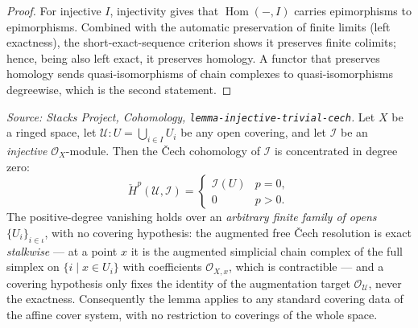 \begin{proof}
  For injective \(I\), injectivity gives that \(\operatorname{Hom}(-, I)\) carries
  epimorphisms to epimorphisms. Combined with the automatic preservation of finite limits
  (left exactness), the short-exact-sequence criterion shows it preserves finite colimits;
  hence, being also left exact, it preserves homology. A functor that preserves homology
  sends quasi-isomorphisms of chain complexes to quasi-isomorphisms degreewise, which is
  the second statement.
\end{proof}

\begin{lemma}
  \label{lem:injective_cech_acyclic}
  \textit{Source: Stacks Project, Cohomology,
  \texttt{lemma-injective-trivial-cech}.}
  Let \(X\) be a ringed space, let \(\mathcal{U} : U =
  \bigcup_{i \in I} U_i\) be any open covering, and let \(\mathcal{I}\) be an
  \emph{injective} \(\mathcal{O}_X\)-module. Then the {\v C}ech cohomology of
  \(\mathcal{I}\) is concentrated in degree zero:
  \[
    \check{H}^p(\mathcal{U}, \mathcal{I}) =
    \begin{cases}
      \mathcal{I}(U) & p = 0, \\
      0 & p > 0.
    \end{cases}
  \]
  The positive-degree vanishing holds over an \emph{arbitrary finite family of opens}
  \(\{U_i\}_{i \in \iota}\), with no covering hypothesis: the augmented free {\v C}ech
  resolution is exact \emph{stalkwise} — at a point \(x\) it is the augmented simplicial
  chain complex of the full simplex on \(\{i \mid x \in U_i\}\) with coefficients
  \(\mathcal{O}_{X,x}\), which is contractible — and a covering hypothesis only fixes the
  identity of the augmentation target \(\mathcal{O}_{\mathcal{U}}\), never the exactness.
  Consequently the lemma applies to any standard covering data of the affine cover system,
  with no restriction to coverings of the whole space.


\end{lemma}
